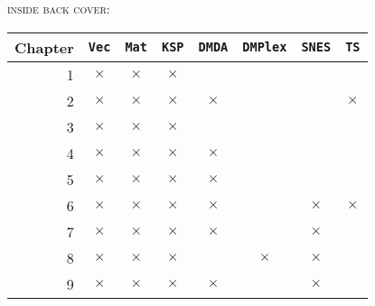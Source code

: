 \documentclass{tufte-book}
\theoremstyle{definition}
\newcommand{\XX}{$\bm{\times}$}  %
\newcommand{\gX}{{\color{Gray} $\times$}}
\newcommand{\pDMDA}{\texttt{DMDA}\xspace}
\newcommand{\pDMPlex}{\texttt{DMPlex}\xspace}
\newcommand{\pKSP}{\texttt{KSP}\xspace}
\newcommand{\pSNES}{\texttt{SNES}\xspace}
\newcommand{\pTS}{\texttt{TS}\xspace}
\newcommand{\pMat}{\texttt{Mat}\xspace}
\newcommand{\pVec}{\texttt{Vec}\xspace}
\begin{document}
\newpage\thispagestyle{empty}
\noindent \textsc{inside back cover:}

\vfill
\begin{center}
\begin{tabular}{rccccccc}
\toprule
Chapter 
    &\;\pVec\; &\;\pMat\;
                &\;\pKSP\; &\pDMDA
                            &\pDMPlex
                                  &\pSNES &\;\pTS\; \\
\midrule
1   & \XX & \XX & \XX &     &     &     &      \\
2   & \XX & \XX & \XX & \XX &     &     & \XX  \\
3   & \XX & \XX & \XX &     &     &     &      \\
4   & \gX & \gX & \XX & \XX &     &     &      \\
5   & \gX & \gX & \XX & \XX &     &     &      \\
6   & \gX & \gX & \XX & \XX &     & \XX & \XX  \\
7   & \gX & \gX & \gX & \XX &     & \XX &      \\
8   & \gX & \gX & \XX &     & \XX & \XX &      \\
9   & \gX & \gX & \gX & \XX &     & \XX &      \\
\bottomrule
\end{tabular}
\end{center}
\vfill
\end{document}
